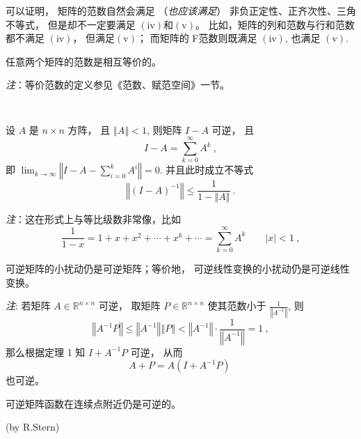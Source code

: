  可以证明， 矩阵的范数自然会满足 （\textsl{也应该满足}） 非负正定性、正齐次性、三角不等式， 但是却不一定要满足 $(\mathrm{iv})$和$(\mathrm{v})$。 比如，矩阵的列和范数与行和范数都不满足 $(\mathrm{iv})$， 但满足$(\mathrm{v})$； 而矩阵的 F范数则既满足 $(\mathrm{iv})$, 也满足 $(\mathrm{v})$. 



\begin{theorem}{}
任意两个矩阵的范数是相互等价的。 

\textsl{注}：等价范数的定义参见《范数、赋范空间》一节。
\end{theorem}
\verb| |

\begin{theorem}{}
设 $A$ 是 $n\times n$ 方阵， 且 $\left\Vert A\right\Vert <1$, 则矩阵 $I-A$
可逆， 且 
\[
I-A=\sum_{k=0}^{\infty}A^{k}~,
\]
即 ${\displaystyle \lim_{k\rightarrow\infty}}\left\Vert I-A-{\displaystyle \sum_{i=0}^{k}A^{i}}\right\Vert =0.$
并且此时成立不等式
\[
\left\Vert (I-A)^{-1}\right\Vert \leqslant{\displaystyle \frac{1}{1-\left\Vert A\right\Vert }~.}
\]
\end{theorem}
\textsl{注}：这在形式上与等比级数非常像，比如
\[
{\displaystyle \frac{1}{1-x}=1+x+x^{2}+\cdots+x^{k}+\cdots=\sum_{k=0}^{\infty}A^{k}\quad\quad|x|<1}~,\]


\begin{corollary}{}
可逆矩阵的小扰动仍是可逆矩阵；等价地， 可逆线性变换的小扰动仍是可逆线性变换。
\end{corollary}

\textsl{注}: 若矩阵 $A\in\mathbb{R}^{n\times n}$ 可逆， 取矩阵 $P\in\mathbb{R}^{n\times n}$
使其范数小于 $\frac{1}{\left\Vert A^{-1}\right\Vert }$, 则
\[
\left\Vert A^{-1}P\right\Vert \leqslant\left\Vert A^{-1}\right\Vert \left\Vert P\right\Vert <\left\Vert A^{-1}\right\Vert \cdot{\displaystyle \frac{1}{\left\Vert A^{-1}\right\Vert }=1~,}
\]
那么根据定理 1 知 $I+A^{-1}P$ 可逆， 从而
\[
A+P=A(I+A^{-1}P)~
\]
也可逆。 

\begin{corollary}{}
可逆矩阵函数在连续点附近仍是可逆的。
\end{corollary} 

(by R.Stern)
